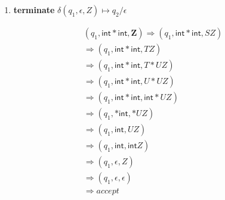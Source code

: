 {\begin{minipage}[t]{0.4\linewidth}
\begin{enumerate}[resume,start=3]
\begin{align*}
  \delta&(q_{1},\mathbf{(},\mathbf{(})& \mapsto &\quad q_{1}/\epsilon\\
  \delta&(q_{1},\mathbf{)},\mathbf{)})& \mapsto &\quad q_{1}/\epsilon
  \end{align*}
\item \textbf{terminate} $\delta(q_{1},\epsilon,Z) \mapsto q_{2}/\epsilon$
\end{enumerate}
\end{minipage}
\begin{minipage}[t]{0.55\linewidth}
\setlength{\abovedisplayskip}{-1em}
\setlength{\belowdisplayskip}{0pt}
  \begin{align*}
    & (q_{1},\mathsf{int * int}, \mathbf{Z}) \Rightarrow (q_{1}, \mathsf{int * int}, SZ)\\
    &\Rightarrow (q_{1}, \mathsf{int * int}, TZ)\\
    &\Rightarrow (q_{1}, \mathsf{int * int}, T*UZ)\\
    &\Rightarrow (q_{1}, \mathsf{int * int}, U*UZ)\\
    &\Rightarrow (q_{1}, \mathsf{int * int}, \mathsf{int}*UZ)\\
    &\Rightarrow (q_{1}, \mathsf{ * int}, *UZ)\\
    &\Rightarrow (q_{1}, \mathsf{int}, UZ)\\
    &\Rightarrow (q_{1}, \mathsf{int}, \mathsf{int}Z)\\
    &\Rightarrow (q_{1}, \epsilon, Z) \\
    &\Rightarrow (q_{1}, \epsilon, \epsilon)\\
    &\Rightarrow accept
  \end{align*}
\end{minipage}
}
